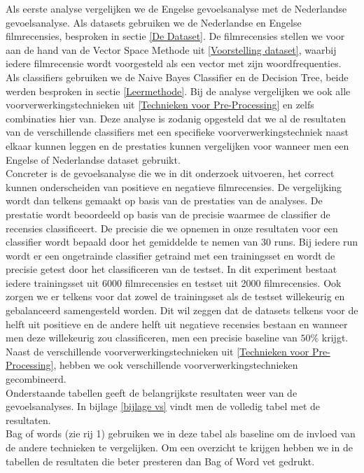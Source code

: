 Als eerste analyse vergelijken we de Engelse gevoelsanalyse met de Nederlandse gevoelsanalyse. Als datasets gebruiken we de Nederlandse en Engelse filmrecensies, besproken in sectie \ref{De Dataset}. De filmrecensies stellen we voor aan de hand van de Vector Space Methode uit \ref{Voorstelling dataset}, waarbij iedere filmrecensie wordt voorgesteld als een vector met zijn woordfrequenties. Als classifiers gebruiken we de Naive Bayes Classifier en de Decision Tree, beide werden besproken in sectie \ref{Leermethode}. Bij de analyse vergelijken we ook alle voorverwerkingstechnieken uit \ref{Technieken voor Pre-Processing} en zelfs combinaties hier van. Deze analyse is zodanig opgesteld dat we al de resultaten van de verschillende classifiers met een specifieke voorverwerkingstechniek naast elkaar kunnen leggen en de prestaties kunnen vergelijken voor wanneer men een Engelse of Nederlandse dataset gebruikt.\\

Concreter is de gevoelsanalyse die we in dit onderzoek uitvoeren, het correct kunnen onderscheiden van positieve en negatieve filmrecensies. De vergelijking wordt dan telkens gemaakt op basis van de prestaties van de analyses. De prestatie wordt beoordeeld op basis van de precisie waarmee de classifier de recensies classificeert. De precisie die we opnemen in onze resultaten voor een classifier wordt bepaald door het gemiddelde te nemen van 30 runs. Bij iedere run wordt er een ongetrainde classifier getraind met een trainingsset en wordt de precisie getest door het classificeren van de testset. In dit experiment bestaat iedere trainingsset uit 6000 filmrecensies en testset uit 2000 filmrecensies. Ook zorgen we er telkens voor dat zowel de trainingsset als de testset willekeurig en gebalanceerd samengesteld worden. Dit wil zeggen dat de datasets telkens voor de helft uit positieve en de andere helft uit negatieve recensies bestaan en wanneer men deze willekeurig zou classificeren, men een precisie baseline van $50\%$ krijgt.\\

Naast de verschillende voorverwerkingstechnieken uit \ref{Technieken voor Pre-Processing}, hebben we ook verschillende voorverwerkingstechnieken gecombineerd.\\
Onderstaande tabellen geeft de belangrijkste resultaten weer van de gevoelsanalyses. In bijlage \ref{bijlage vs} vindt men de volledig tabel met de resultaten. \\ 
Bag of words (zie rij 1) gebruiken we in deze tabel als baseline om de invloed van de andere technieken te vergelijken. Om een overzicht te krijgen hebben we in de tabellen de resultaten die beter presteren dan Bag of Word vet gedrukt. 

